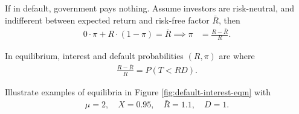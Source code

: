 \documentclass[main.tex]{subfiles}
\begin{document}
        If in default, government pays nothing. Assume investors are risk-neutral, and indifferent between expected return and risk-free factor $\bar{R}$, then
        \begin{align}
            0 \cdot \pi + R \cdot (1-\pi) = \bar R
            \implies
            \pi &= \frac{R - \bar R}{R}.
            \label{eqn:investor-indifference}
        \end{align}
        
            
        In equilibrium, interest and default probabilities $(R, \pi)$ are where
        \begin{align}
            \frac{R - \bar R}{R} = P(T < RD).
            \label{eqn:default-interest-eqm}
        \end{align}
        
        Illustrate examples of equilibria in Figure \eqref{fig:default-interest-eqm} with
        \begin{align}
            \mu = 2, \quad
            X = 0.95, \quad
            \bar R = 1.1, \quad
            D = 1.
        \end{align}
        
\end{document}
